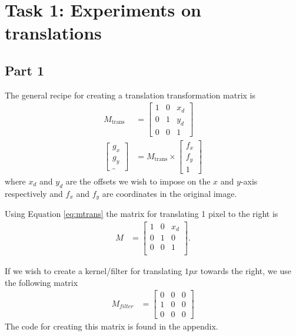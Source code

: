 \section{Task 1: Experiments on translations}

\subsection{Part 1}
The general recipe for creating a translation transformation matrix is
\begin{align}
    M_\text{trans} &= \begin{bmatrix}
                        1 & 0 & x_d \\
                        0 & 1 & y_d \\
                        0 & 0 & 1 
                      \end{bmatrix}
                      \label{eq:mtrans} \\
    \begin{bmatrix}
        g_x \\ g_y \\ \_
    \end{bmatrix}    &= M_\text{trans} \times \begin{bmatrix}
                                      f_x \\ f_y \\ 1
                                    \end{bmatrix} \label{eq:mapply}
\end{align}
where $x_d$ and $y_d$ are the offsets we wish to impose on the $x$ and $y$-axis respectively and
$f_x$ and $f_y$ are coordinates in the original image.

Using Equation \ref{eq:mtrans} the matrix for translating 1 pixel to the right is 
\begin{align*}
       M &= \begin{bmatrix}
              1 & 0 & x_d \\
              0 & 1 & 0   \\
              0 & 0 & 1   \\
            \end{bmatrix}.
\end{align*}

If we wish to create a kernel/filter for translating $1px$ towards the right, we use the following matrix
\begin{align*}
    M_{filter} &= \begin{bmatrix}
                    0 & 0 & 0 \\
                    1 & 0 & 0 \\
                    0 & 0 & 0
                  \end{bmatrix}
\end{align*}
The code for creating this matrix is found in the appendix.

